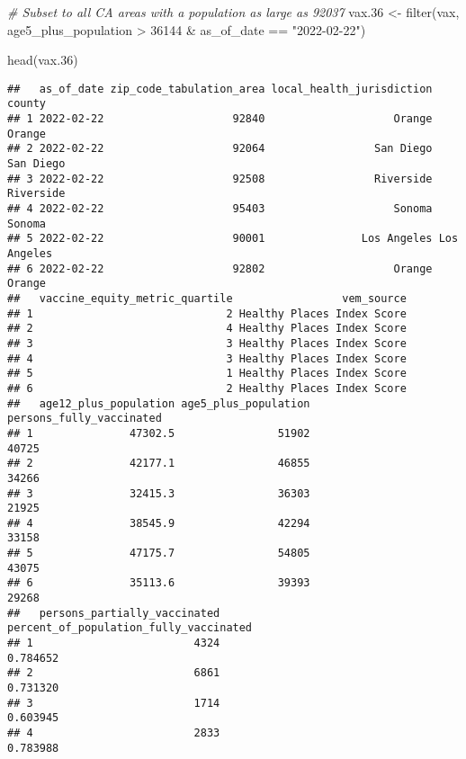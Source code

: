 \documentclass[
]{article}
\newenvironment{Shaded}{\begin{snugshade}}{\end{snugshade}}
\newcommand{\CommentTok}[1]{\textcolor[rgb]{0.56,0.35,0.01}{\textit{#1}}}
\newcommand{\DecValTok}[1]{\textcolor[rgb]{0.00,0.00,0.81}{#1}}
\newcommand{\FloatTok}[1]{\textcolor[rgb]{0.00,0.00,0.81}{#1}}
\newcommand{\FunctionTok}[1]{\textcolor[rgb]{0.00,0.00,0.00}{#1}}
\newcommand{\NormalTok}[1]{#1}
\newcommand{\OtherTok}[1]{\textcolor[rgb]{0.56,0.35,0.01}{#1}}
\newcommand{\SpecialCharTok}[1]{\textcolor[rgb]{0.00,0.00,0.00}{#1}}
\newcommand{\StringTok}[1]{\textcolor[rgb]{0.31,0.60,0.02}{#1}}
\begin{document}
\begin{Shaded}
\begin{Highlighting}[]
\CommentTok{\# Subset to all CA areas with a population as large as 92037}
\NormalTok{vax}\FloatTok{.36} \OtherTok{\textless{}{-}} \FunctionTok{filter}\NormalTok{(vax, age5\_plus\_population }\SpecialCharTok{\textgreater{}} \DecValTok{36144} \SpecialCharTok{\&}
\NormalTok{                as\_of\_date }\SpecialCharTok{==} \StringTok{"2022{-}02{-}22"}\NormalTok{)}

\FunctionTok{head}\NormalTok{(vax}\FloatTok{.36}\NormalTok{)}
\end{Highlighting}
\end{Shaded}

\begin{verbatim}
##   as_of_date zip_code_tabulation_area local_health_jurisdiction      county
## 1 2022-02-22                    92840                    Orange      Orange
## 2 2022-02-22                    92064                 San Diego   San Diego
## 3 2022-02-22                    92508                 Riverside   Riverside
## 4 2022-02-22                    95403                    Sonoma      Sonoma
## 5 2022-02-22                    90001               Los Angeles Los Angeles
## 6 2022-02-22                    92802                    Orange      Orange
##   vaccine_equity_metric_quartile                 vem_source
## 1                              2 Healthy Places Index Score
## 2                              4 Healthy Places Index Score
## 3                              3 Healthy Places Index Score
## 4                              3 Healthy Places Index Score
## 5                              1 Healthy Places Index Score
## 6                              2 Healthy Places Index Score
##   age12_plus_population age5_plus_population persons_fully_vaccinated
## 1               47302.5                51902                    40725
## 2               42177.1                46855                    34266
## 3               32415.3                36303                    21925
## 4               38545.9                42294                    33158
## 5               47175.7                54805                    43075
## 6               35113.6                39393                    29268
##   persons_partially_vaccinated percent_of_population_fully_vaccinated
## 1                         4324                               0.784652
## 2                         6861                               0.731320
## 3                         1714                               0.603945
## 4                         2833                               0.783988

\end{verbatim}
\end{document}
